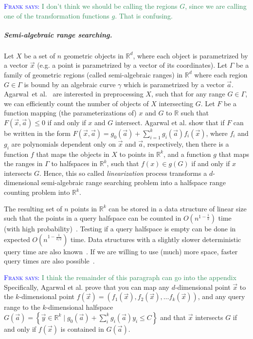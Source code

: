 \documentclass[UKenglish]{lipics-v2019}
\newcommand{\myremark}[4]{\textcolor{blue}{\textsc{#1 #2:}} \textcolor{#4}{\textsf{#3}}}
\newcommand{\frank}[2][says]{\myremark{Frank}{#1}{#2}{SeaGreen}}
\newcommand{\etal}{\textnormal{et al.}\xspace}
\newcommand{\mkmbb}[1]{\ensuremath{\mathbb{#1}}\xspace}
\newcommand{\R}{\mkmbb{R}}
\begin{document}
\frank{I don't think we should be calling the regions $G$, since we
  are calling one of the transformation functions $g$. That is
  confusing.}  \subparagraph{Semi-algebraic range searching.}  Let $X$
be a set of $n$ geometric objects in $\mathbb{R}^d$, where each object
is parametrized by a vector $\vec{x}$ (e.g. a point is parametrized by
a vector of its coordinates). Let $\Gamma$ be a family of geometric
regions (called semi-algebraic ranges) in $\mathbb{R}^d$ where each
region $G \in \Gamma$ is bound by an algebraic curve $\gamma$ which is
parametrized by a vector
$\vec{a}$. Agarwal~\etal~\cite{agarwal2013range} are interested in
preprocessing $X$, such that for any range $G \in \Gamma$, we can
efficiently count the number of objects of $X$ intersecting $G$. Let
$F$ be a function mapping (the parameterizations of) $x$ and $G$ to
$\R$ such that $F(\vec{x},\vec{a}) \leq 0$ if and only if $x$ and $G$
intersect. Agarwal \etal show that if $F$ can be written in the form
$F(\vec{x}, \vec{a}) = g_0(\vec{a}) + \sum_{i=1}^k
g_i(\vec{a})f_i(\vec{x})$, where $f_i$ and $g_i$ are polynomials
dependent only on $\vec{x}$ and $\vec{a}$, respectively, then there is
a function $f$ that maps the objects in $X$ to points in $\R^k$, and a
function $g$ that maps the ranges in $\Gamma$ to halfspaces in $\R^k$,
such that $f(x) \in g(G)$ if and only if $x$ intersects $G$. Hence,
this so called \emph{linearization} process transforms a
$d$-dimensional semi-algebraic range searching problem into a
halfspace range counting problem into $\mathbb{R}^k$.

The resulting set of $n$ points in $\R^k$ can be stored in a data
structure of linear size such that the points in a query halfspace can
be counted in $O(n^{1-\frac{1}{k}})$ time (with high
probability)~\cite{chan2012optimal}. Testing if a query halfspace is
empty can be done in expected $O(n^{1-\frac{1}{k/2}})$ time. Data
structures with a slightly slower deterministic query time are also
known~\cite{chan2012optimal}. If we are willing to use (much) more
space, faster query times are also
possible~\cite{Mat1993,chan2012optimal}.

\frank{I think the remainder of this paragraph can go into the
  appendix} Specifically, Agarwal \etal prove that you can map any
$d$-dimensional point $\vec{x}$ to the $k$-dimensional point
$f(\vec{x}) = (f_1(\vec{x}), f_2(\vec{x}), \dots f_k(\vec{x}))$, and
any query range to the $k$-dimensional halfspace
$G(\vec{a}) = \left\{ \vec{y} \in \mathbb{R}^k \mid g_0(\vec{a}) +
  \sum_i^k g_i(\vec{a})y_i \le C \right\}$ and that $\vec{x}$
intersects $G$ if and only if $f(\vec{x})$ is contained in
$G(\vec{a})$.
\end{document}
